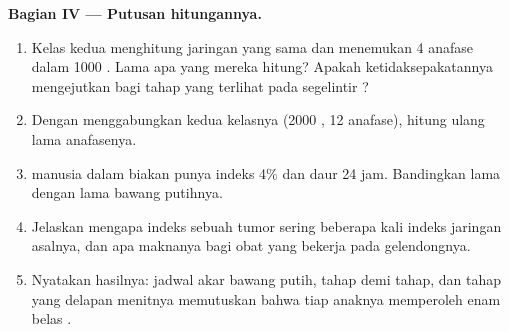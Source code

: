 \begin{problem}
\medskip
\noindent\textbf{Bagian IV --- Putusan hitungannya.}
\begin{enumerate}[resume]
  \item Kelas kedua menghitung jaringan yang sama dan menemukan 4
        anafase dalam 1000 . Lama apa yang mereka hitung? Apakah
        ketidaksepakatannya mengejutkan bagi tahap yang terlihat pada
        segelintir ?
  \item Dengan menggabungkan kedua kelasnya (2000 , 12 anafase),
        hitung ulang lama anafasenya.
  \item {} manusia dalam biakan punya indeks  4\% dan daur 24
        jam. Bandingkan lama  dengan lama  bawang putihnya.
  \item Jelaskan mengapa indeks  sebuah tumor sering beberapa
        kali indeks jaringan asalnya, dan apa maknanya bagi obat yang
        bekerja pada gelendongnya.
  \item Nyatakan hasilnya: jadwal  akar bawang putih, tahap
        demi tahap, dan tahap yang delapan menitnya memutuskan bahwa
        tiap anaknya memperoleh enam belas .
\end{enumerate}
\end{problem}
